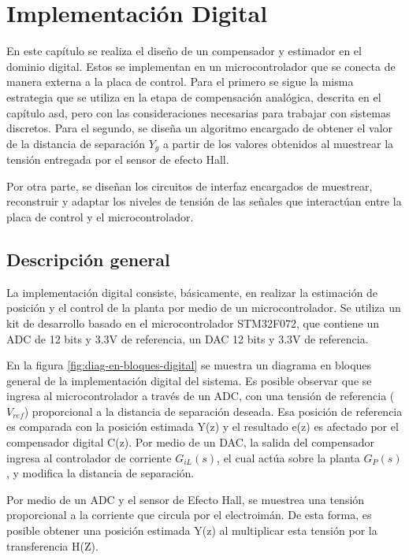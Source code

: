 \chapter{Implementación Digital}  \label{cap:Implementacion digital}

En este capítulo se realiza el diseño de un compensador y estimador en el dominio digital. Estos se implementan en un microcontrolador que se conecta de manera externa a la placa de control. Para el primero se sigue la misma estrategia que se utiliza en la etapa de compensación analógica, descrita en el capítulo asd, pero con las consideraciones necesarias para trabajar con sistemas discretos. Para el segundo, se diseña un algoritmo encargado de obtener el valor de la distancia de separación $Y_g$ a partir de los valores obtenidos al muestrear la tensión entregada por el sensor de efecto Hall.

Por otra parte, se diseñan los circuitos de interfaz encargados de muestrear, reconstruir y adaptar los niveles de tensión de las señales que interactúan entre la placa de control y el microcontrolador.


\section{Descripción general}

\noindent La implementación digital consiste, básicamente, en realizar la estimación de posición y el control de la planta por medio de un microcontrolador. Se utiliza un kit de desarrollo basado en el microcontrolador STM32F072, que contiene un ADC de 12 bits y 3.3V de referencia, un DAC 12 bits y 3.3V de referencia.

\noindent En la figura \ref{fig:diag-en-bloques-digital} se muestra un diagrama en bloques general de la implementación digital del sistema. Es posible observar que se ingresa al microcontrolador a través de un ADC, con una tensión de referencia ($V_{ref}$) proporcional a la distancia de separación deseada. Esa posición de referencia es comparada con la posición estimada Y(z) y el resultado e(z) es afectado por el compensador digital C(z). Por medio de un DAC, la salida del compensador ingresa al controlador de corriente $G_{iL}(s)$, el cual actúa sobre la planta $G_P(s)$, y modifica la distancia de separación.

\noindent Por medio de un ADC y el sensor de Efecto Hall, se muestrea una tensión proporcional a la corriente que circula por el electroimán. De esta forma, es posible obtener una posición estimada Y(z) al multiplicar esta tensión por la transferencia H(Z).


